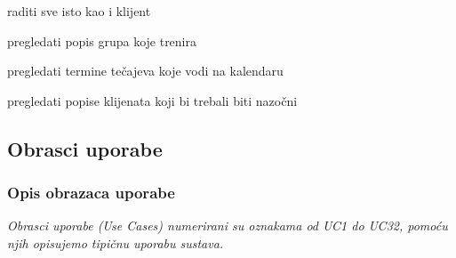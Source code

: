 \begin{packed_enum}
				\item {}
				\begin{packed_enum}
					\item raditi sve isto kao i klijent
					\item pregledati popis grupa koje trenira
					\item pregledati termine tečajeva koje vodi na kalendaru
					\item pregledati popise klijenata koji bi trebali biti nazočni
				\end{packed_enum}
					
				
					
					
			\end{packed_enum}
			
			\eject 
			
			
				
			\subsection{Obrasci uporabe}
				

				\subsubsection{Opis obrazaca uporabe}
					\textit{ Obrasci uporabe (Use Cases) numerirani su oznakama od UC1 do UC32, pomoću njih opisujemo tipičnu uporabu sustava.}\\
				
